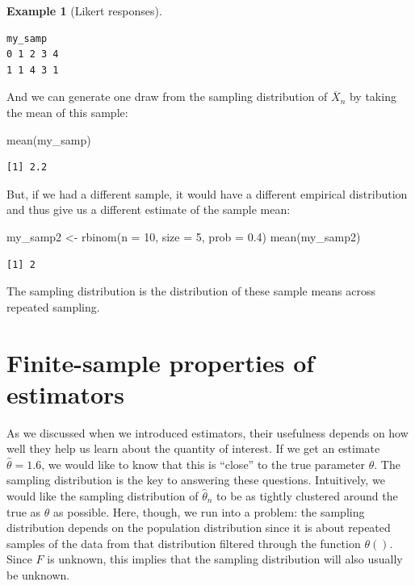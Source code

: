 \documentclass[
  letterpaper,
  DIV=11,
  numbers=noendperiod]{scrreprt}
\newenvironment{Shaded}{\begin{snugshade}}{\end{snugshade}}
\newcommand{\AttributeTok}[1]{\textcolor[rgb]{0.40,0.45,0.13}{#1}}
\newcommand{\DecValTok}[1]{\textcolor[rgb]{0.68,0.00,0.00}{#1}}
\newcommand{\FloatTok}[1]{\textcolor[rgb]{0.68,0.00,0.00}{#1}}
\newcommand{\FunctionTok}[1]{\textcolor[rgb]{0.28,0.35,0.67}{#1}}
\newcommand{\NormalTok}[1]{\textcolor[rgb]{0.00,0.23,0.31}{#1}}
\newcommand{\OtherTok}[1]{\textcolor[rgb]{0.00,0.23,0.31}{#1}}
\newcommand{\Xbar}{\overline{X}}
\theoremstyle{definition}
\theoremstyle{plain}
\theoremstyle{definition}
\newtheorem{example}{Example}[chapter]
\theoremstyle{remark}
\begin{document}
\begin{example}[Likert
responses]
\begin{verbatim}
my_samp
0 1 2 3 4 
1 1 4 3 1 
\end{verbatim}

And we can generate one draw from the sampling distribution of
\(\Xbar_n\) by taking the mean of this sample:

\begin{Shaded}
\begin{Highlighting}[]
\FunctionTok{mean}\NormalTok{(my\_samp)}
\end{Highlighting}
\end{Shaded}

\begin{verbatim}
[1] 2.2
\end{verbatim}

But, if we had a different sample, it would have a different empirical
distribution and thus give us a different estimate of the sample mean:

\begin{Shaded}
\begin{Highlighting}[]
\NormalTok{my\_samp2 }\OtherTok{\textless{}{-}} \FunctionTok{rbinom}\NormalTok{(}\AttributeTok{n =} \DecValTok{10}\NormalTok{, }\AttributeTok{size =} \DecValTok{5}\NormalTok{, }\AttributeTok{prob =} \FloatTok{0.4}\NormalTok{)}
\FunctionTok{mean}\NormalTok{(my\_samp2) }
\end{Highlighting}
\end{Shaded}

\begin{verbatim}
[1] 2
\end{verbatim}

The sampling distribution is the distribution of these sample means
across repeated sampling.

\end{example}

\hypertarget{finite-sample-properties-of-estimators}{%
\section{Finite-sample properties of
estimators}\label{finite-sample-properties-of-estimators}}

As we discussed when we introduced estimators, their usefulness depends
on how well they help us learn about the quantity of interest. If we get
an estimate \(\widehat{\theta} = 1.6\), we would like to know that this
is ``close'' to the true parameter \(\theta\). The sampling distribution
is the key to answering these questions. Intuitively, we would like the
sampling distribution of \(\widehat{\theta}_n\) to be as tightly
clustered around the true as \(\theta\) as possible. Here, though, we
run into a problem: the sampling distribution depends on the population
distribution since it is about repeated samples of the data from that
distribution filtered through the function \(\theta()\). Since \(F\) is
unknown, this implies that the sampling distribution will also usually
be unknown.
\end{document}

